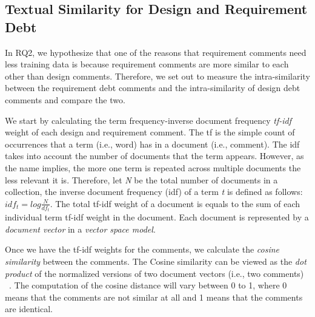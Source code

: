 


\subsection{Textual Similarity for Design and Requirement Debt}

In RQ2, we hypothesize that one of the reasons that requirement \SATD comments need less training data is because requirement \SATD comments are more similar to each other than design \SATD comments. Therefore, we set out to measure the intra-similarity between the requirement debt comments and the intra-similarity of design debt comments and compare the two.

We start by calculating the term frequency-inverse document frequency \textit{tf-idf} weight of each design and requirement \SATD comment. The tf is the simple count of occurrences that a term (i.e., word) has in a document (i.e., comment). The idf takes into account the number of documents that the term appears. However, as the name implies, the more one term is repeated across multiple documents the less relevant it is. Therefore, let \textit{N} be the total number of documents in a collection, the inverse document frequency (idf) of a term \textit{t} is defined as follows: \(idf_{t} = log\frac{N}{df_{t}}\). The total tf-idf weight of a document is equals to the sum of each individual term tf-idf weight in the document. Each document is represented by a \textit{document vector} in a \textit{vector space model}. 

Once we have the tf-idf weights for the comments, we calculate the \textit{cosine similarity} between the comments. The Cosine similarity can be viewed as the \textit{dot product} of the normalized versions of two document vectors (i.e., two comments) ~\cite{Manning2008book}. The computation of the cosine distance will vary between 0 to 1, where 0 means that the comments are not similar at all and 1 means that the comments are identical.

